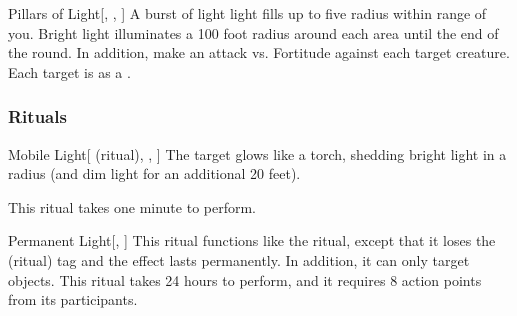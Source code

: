 \lowercase{\hypertarget{spell:Pillars of Light}{}}\label{spell:Pillars of Light}
\begin{freeability}[Rank 8]{\hypertarget{spell:Pillars of Light}{Pillars of Light}}[, , ]
A burst of light light fills up to five \areasmall radius  within \rngmed range of you.
Bright light illuminates a 100 foot radius around each area until the end of the round.
In addition, make an attack vs. Fortitude against each target creature.
\hit Each target is \dazzled as a .
\end{freeability}
\vspace{0.25em}



\subsubsection{Rituals}


\lowercase{\hypertarget{spell:Mobile Light}{}}\label{spell:Mobile Light}
\begin{attuneability}[Rank 1]{\hypertarget{spell:Mobile Light}{Mobile Light}}[ (ritual), , ]
The target glows like a torch, shedding bright light in a \areamed radius (and dim light for an additional 20 feet).

This ritual takes one minute to perform.
\end{attuneability}
\vspace{0.25em}



\lowercase{\hypertarget{spell:Permanent Light}{}}\label{spell:Permanent Light}
\begin{apability}[Rank 3]{\hypertarget{spell:Permanent Light}{Permanent Light}}[, ]
This ritual functions like the  ritual, except that it loses the  (ritual) tag and the effect lasts permanently.
In addition, it can only target objects.
This ritual takes 24 hours to perform, and it requires 8 action points from its participants.
\end{apability}
\vspace{0.25em}


